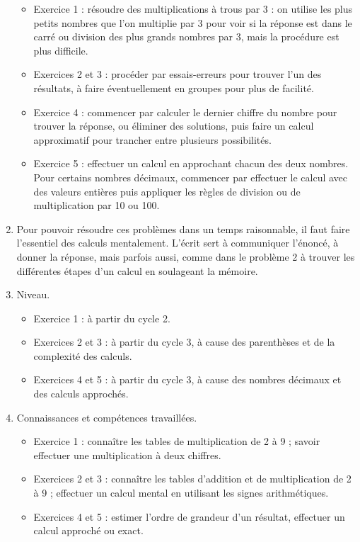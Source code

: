 \begin{corrige}
\begin{enumerate}
\begin{itemize}
      \item Exercice 1 : résoudre des multiplications à trous par 3 : on utilise les plus petits nombres que l'on multiplie par 3 pour voir si la réponse est dans le carré ou division des plus grands nombres par 3, mais la procédure est plus difficile.
      \item Exercices 2 et 3 : procéder par essais-erreurs pour trouver l'un des résultats, à faire éventuellement en groupes pour plus de facilité.
      \item Exercice 4 : commencer par calculer le dernier chiffre du nombre pour trouver la réponse, ou éliminer des solutions, puis faire un calcul approximatif pour trancher entre plusieurs possibilités.
      \item Exercice 5 : effectuer un calcul en approchant chacun des deux nombres. Pour certains nombres décimaux, commencer par effectuer le calcul avec des valeurs entières puis appliquer les règles de division ou de multiplication par 10 ou 100. 
   \end{itemize}   
   \item Pour pouvoir résoudre ces problèmes dans un temps raisonnable, il faut faire l'essentiel des calculs mentalement. L'écrit sert à communiquer l'énoncé, à donner la réponse, mais parfois aussi, comme dans le problème 2 à trouver les différentes étapes d'un calcul en soulageant la mémoire.
   \item Niveau.
   \begin{itemize}
      \item Exercice 1 : à partir du cycle 2.
      \item Exercices 2 et 3 : à partir du cycle 3, à cause des parenthèses et de la complexité des calculs.
      \item Exercices 4 et 5 : à partir du cycle 3, à cause des nombres décimaux et des calculs approchés.
   \end{itemize}
   \item Connaissances et compétences travaillées.
   \begin{itemize}
      \item Exercice 1 : connaître les tables de multiplication de 2 à 9 ; savoir effectuer une multiplication à deux chiffres.
      \item Exercices 2 et 3 : connaître les tables d'addition et de multiplication de 2 à 9 ; effectuer un calcul mental en utilisant les signes arithmétiques.
      \item Exercices 4 et 5 : estimer l'ordre de grandeur d'un résultat, effectuer un calcul approché ou exact.

\end{itemize}
\end{enumerate}
\end{corrige}
